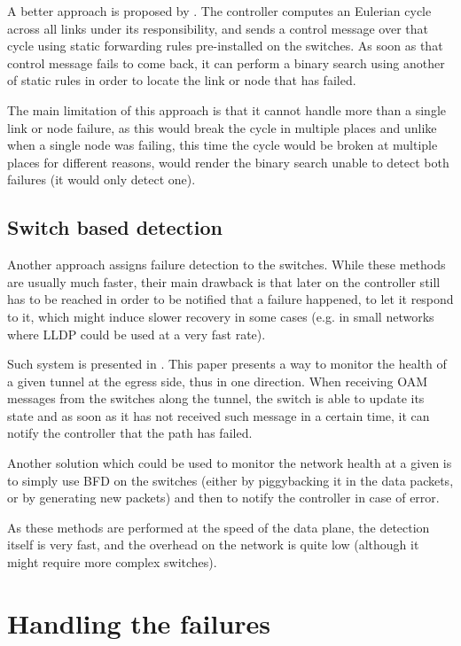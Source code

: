 \documentclass[compsoc]{IEEEtran}
\begin{document}
A better approach is proposed by \cite{2013arXiv1308.4465K}. The controller computes an Eulerian cycle across all links under its responsibility, and sends a control message over that cycle using static forwarding rules pre-installed on the switches. As soon as that control message fails to come back, it can perform a binary search using another of static rules in order to locate the link or node that has failed.

The main limitation of this approach is that it cannot handle more than a single link or node failure, as this would break the cycle in multiple places and unlike when a single node was failing, this time the cycle would be broken at multiple places for different reasons, would render the binary search unable to detect both failures (it would only detect one).

\subsection{Switch based detection}
Another approach assigns failure detection to the switches. While these methods are usually much faster, their main drawback is that later on the controller still has to be reached in order to be notified that a failure happened, to let it respond to it, which might induce slower recovery in some cases (e.g. in small networks where LLDP could be used at a very fast rate).

Such system is presented in \cite{6364688}. This paper presents a way to monitor the health of a given tunnel at the egress side, thus in one direction. When receiving OAM messages from the switches along the tunnel, the switch is able to update its state and as soon as it has not received such message in a certain time, it can notify the controller that the path has failed.

Another solution which could be used to monitor the network health at a given is to simply use BFD on the switches (either by piggybacking it in the data packets, or by generating new packets) and then to notify the controller in case of error.

As these methods are performed at the speed of the data plane, the detection itself is very fast, and the overhead on the network is quite low (although it might require more complex switches).

\section{Handling the failures}
\end{document}

